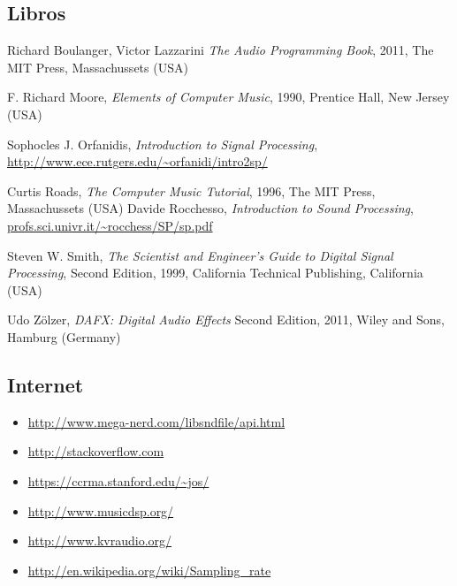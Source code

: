 \documentclass[a4paper,spanish,12pt]{article}
\begin{document}
\subsection{Libros}
\begin{thebibliography}{9}
  Richard Boulanger, Victor Lazzarini
  \emph{The Audio Programming Book},
  2011, The MIT Press, Massachussets (USA)
 
  F. Richard Moore,
  \emph{Elements of Computer Music},
  1990, Prentice Hall, New Jersey (USA)

  Sophocles J. Orfanidis,
  \emph{Introduction to Signal Processing}, \\
  \url{http://www.ece.rutgers.edu/~orfanidi/intro2sp/}
  
  Curtis Roads,
  \emph{The Computer Music Tutorial},
  1996, The MIT Press, Massachussets (USA)
  Davide Rocchesso,
  \emph{Introduction to Sound Processing},
  \url{profs.sci.univr.it/~rocchess/SP/sp.pdf}
  
  Steven W. Smith,
  \emph{The Scientist and Engineer's Guide to Digital Signal Processing},
  Second Edition, 1999, California Technical Publishing, California (USA)
  
  Udo Zölzer,
  \emph{DAFX: Digital Audio Effects}
  Second Edition, 2011, Wiley and Sons, Hamburg (Germany)
\end{thebibliography}
  
\subsection{Internet}

\begin{itemize}
\item \url{http://www.mega-nerd.com/libsndfile/api.html}
\item \url{http://stackoverflow.com}
\item \url{https://ccrma.stanford.edu/~jos/}
\item \url{http://www.musicdsp.org/}
\item \url{http://www.kvraudio.org/}
\item \url{http://en.wikipedia.org/wiki/Sampling_rate}

\end{itemize}
\end{document}
